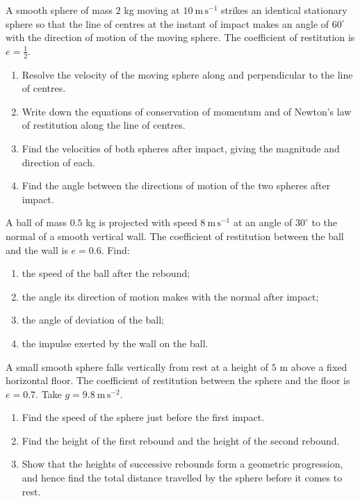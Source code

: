 \documentclass[11pt]{article}
\newcounter{popsec}
\newcounter{popsub}
\newcommand{\courssub}[1]{%
  \stepcounter{popsub}%
  \par\vspace{9pt}\noindent{\popxbold\fontsize{11.5}{13}\selectfont\color{popink}{\color{poporange}\thepopsec.\thepopsub}\hspace{6pt}#1}\par\nopagebreak\vspace{4pt}
}
\begin{document}
\courssub{I practise}

\begin{exercice}
A smooth sphere of mass $2$ kg moving at $10\ \mathrm{m\,s^{-1}}$ strikes an identical stationary sphere so that the line of centres at the instant of impact makes an angle of $60^{\circ}$ with the direction of motion of the moving sphere. The coefficient of restitution is $e=\tfrac{1}{2}$.
\begin{enumerate}
\item Resolve the velocity of the moving sphere along and perpendicular to the line of centres.
\item Write down the equations of conservation of momentum and of Newton's law of restitution along the line of centres.
\item Find the velocities of both spheres after impact, giving the magnitude and direction of each.
\item Find the angle between the directions of motion of the two spheres after impact.
\end{enumerate}
\end{exercice}

\begin{exercice}
A ball of mass $0.5$ kg is projected with speed $8\ \mathrm{m\,s^{-1}}$ at an angle of $30^{\circ}$ to the normal of a smooth vertical wall. The coefficient of restitution between the ball and the wall is $e=0.6$. Find:
\begin{enumerate}
\item the speed of the ball after the rebound;
\item the angle its direction of motion makes with the normal after impact;
\item the angle of deviation of the ball;
\item the impulse exerted by the wall on the ball.
\end{enumerate}
\end{exercice}

\begin{exercice}
A small smooth sphere falls vertically from rest at a height of $5$ m above a fixed horizontal floor. The coefficient of restitution between the sphere and the floor is $e=0.7$. Take $g=9.8\ \mathrm{m\,s^{-2}}$.
\begin{enumerate}
\item Find the speed of the sphere just before the first impact.
\item Find the height of the first rebound and the height of the second rebound.
\item Show that the heights of successive rebounds form a geometric progression, and hence find the total distance travelled by the sphere before it comes to rest.
\end{enumerate}
\end{exercice}
\end{document}
